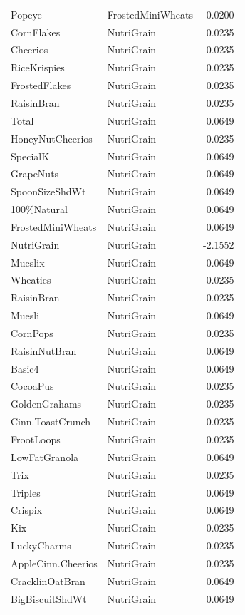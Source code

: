 \begin{longtable}{llr}
Popeye & FrostedMiniWheats & 0.0200 \\
CornFlakes & NutriGrain & 0.0235 \\
Cheerios & NutriGrain & 0.0235 \\
RiceKrispies & NutriGrain & 0.0235 \\
FrostedFlakes & NutriGrain & 0.0235 \\
RaisinBran & NutriGrain & 0.0235 \\
Total & NutriGrain & 0.0649 \\
HoneyNutCheerios & NutriGrain & 0.0235 \\
SpecialK & NutriGrain & 0.0649 \\
GrapeNuts & NutriGrain & 0.0649 \\
SpoonSizeShdWt & NutriGrain & 0.0649 \\
100\%Natural & NutriGrain & 0.0649 \\
FrostedMiniWheats & NutriGrain & 0.0649 \\
NutriGrain & NutriGrain & -2.1552 \\
Mueslix & NutriGrain & 0.0649 \\
Wheaties & NutriGrain & 0.0235 \\
RaisinBran & NutriGrain & 0.0235 \\
Muesli & NutriGrain & 0.0649 \\
CornPops & NutriGrain & 0.0235 \\
RaisinNutBran & NutriGrain & 0.0649 \\
Basic4 & NutriGrain & 0.0649 \\
CocoaPus & NutriGrain & 0.0235 \\
GoldenGrahams & NutriGrain & 0.0235 \\
Cinn.ToastCrunch & NutriGrain & 0.0235 \\
FrootLoops & NutriGrain & 0.0235 \\
LowFatGranola & NutriGrain & 0.0649 \\
Trix & NutriGrain & 0.0235 \\
Triples & NutriGrain & 0.0649 \\
Crispix & NutriGrain & 0.0649 \\
Kix & NutriGrain & 0.0235 \\
LuckyCharms & NutriGrain & 0.0235 \\
AppleCinn.Cheerios & NutriGrain & 0.0235 \\
CracklinOatBran & NutriGrain & 0.0649 \\
BigBiscuitShdWt & NutriGrain & 0.0649 \\

\end{longtable}
